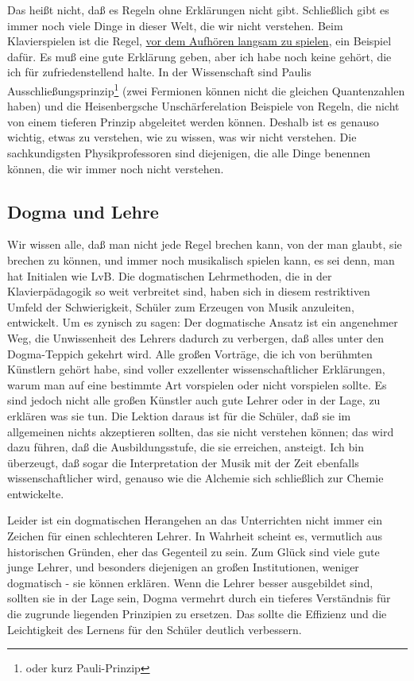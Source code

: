 Das heißt nicht, daß es Regeln ohne Erklärungen nicht gibt.
Schließlich gibt es immer noch viele Dinge in dieser Welt, die wir nicht verstehen.
Beim Klavierspielen ist die Regel, \hyperref[c1ii17]{vor dem Aufhören langsam zu spielen}, ein Beispiel dafür.
Es muß eine gute Erklärung geben, aber ich habe noch keine gehört, die ich für zufriedenstellend halte.
In der Wissenschaft sind Paulis Ausschließungsprinzip\footnote{oder kurz Pauli-Prinzip} (zwei Fermionen können nicht die gleichen Quantenzahlen haben) und die Heisenbergsche Unschärferelation Beispiele von Regeln, die nicht von einem tieferen Prinzip abgeleitet werden können.
Deshalb ist es genauso wichtig, etwas zu verstehen, wie zu wissen, was wir nicht verstehen.
Die sachkundigsten Physikprofessoren sind diejenigen, die alle Dinge benennen können, die wir immer noch nicht verstehen.


\subsection{Dogma und Lehre}
\label{c3_3g}

Wir wissen alle, daß man nicht jede Regel brechen kann, von der man glaubt, sie brechen zu können, und immer noch musikalisch spielen kann, es sei denn, man hat Initialen wie LvB.
Die dogmatischen Lehrmethoden, die in der Klavierpädagogik so weit verbreitet sind, haben sich in diesem restriktiven Umfeld der Schwierigkeit, Schüler zum Erzeugen von Musik anzuleiten, entwickelt.
Um es zynisch zu sagen: Der dogmatische Ansatz ist ein angenehmer Weg, die Unwissenheit des Lehrers dadurch zu verbergen, daß alles unter den Dogma-Teppich gekehrt wird.
Alle großen Vorträge, die ich von berühmten Künstlern gehört habe, sind voller exzellenter wissenschaftlicher Erklärungen, warum man auf eine bestimmte Art vorspielen oder nicht vorspielen sollte.
Es sind jedoch nicht alle großen Künstler auch gute Lehrer oder in der Lage, zu erklären was sie tun.
Die Lektion daraus ist für die Schüler, daß sie im allgemeinen nichts akzeptieren sollten, das sie nicht verstehen können; das wird dazu führen, daß die Ausbildungsstufe, die sie erreichen, ansteigt.
Ich bin überzeugt, daß sogar die Interpretation der Musik mit der Zeit ebenfalls wissenschaftlicher wird, genauso wie die Alchemie sich schließlich zur Chemie entwickelte.

Leider ist ein dogmatischen Herangehen an das Unterrichten nicht immer ein Zeichen für einen schlechteren Lehrer.
In Wahrheit scheint es, vermutlich aus historischen Gründen, eher das Gegenteil zu sein.
Zum Glück sind viele gute junge Lehrer, und besonders diejenigen an großen Institutionen, weniger dogmatisch - sie können erklären.
Wenn die Lehrer besser ausgebildet sind, sollten sie in der Lage sein, Dogma vermehrt durch ein tieferes Verständnis für die zugrunde liegenden Prinzipien zu ersetzen.
Das sollte die Effizienz und die Leichtigkeit des Lernens für den Schüler deutlich verbessern.

